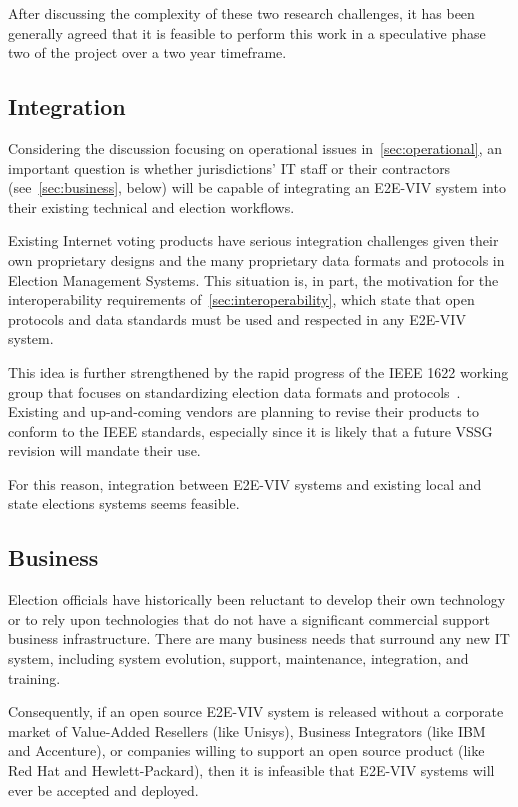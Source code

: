 After discussing the complexity of these two research challenges, it
has been generally agreed that it is feasible to perform this work in
a speculative phase two of the project over a two year timeframe.

\subsection{Integration}

Considering the discussion focusing on operational issues
in~\autoref{sec:operational}, an important question is whether
jurisdictions' IT staff or their contractors
(see~\autoref{sec:business}, below) will be capable of integrating an
E2E-VIV system into their existing technical and election workflows.

Existing Internet voting products have serious integration challenges
given their own proprietary designs and the many proprietary data
formats and protocols in Election Management Systems.  This situation
is, in part, the motivation for the interoperability requirements
of~\autoref{sec:interoperability}, which state that open protocols and
data standards must be used and respected in any E2E-VIV system.

This idea is further strengthened by the rapid progress of the IEEE
1622 working group that focuses on standardizing election data formats
and protocols~\cite{IEEE1622}. Existing and up-and-coming vendors are
planning to revise their products to conform to the IEEE standards,
especially since it is likely that a future VSSG revision will mandate
their use.

For this reason, integration between E2E-VIV systems and existing
local and state elections systems seems feasible.

\subsection{Business}
\label{sec:business}

Election officials have historically been reluctant to develop their
own technology or to rely upon technologies that do not have a
significant commercial support business infrastructure. There are many
business needs that surround any new IT system, including system
evolution, support, maintenance, integration, and training.

Consequently, if an open source E2E-VIV system is released without a
corporate market of Value-Added Resellers (like Unisys), Business
Integrators (like IBM and Accenture), or companies willing to support
an open source product (like Red Hat and Hewlett-Packard), then it is
infeasible that E2E-VIV systems will ever be accepted and deployed.

